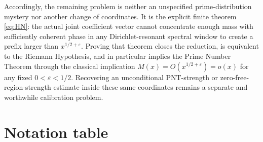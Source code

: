 \documentclass[11pt]{article}
\theoremstyle{definition}
\begin{document}
Accordingly, the remaining problem is neither an unspecified prime-distribution mystery nor another change of coordinates.  It is the explicit finite theorem \eqref{eq:HN}: the actual joint coefficient vector cannot concentrate enough mass with sufficiently coherent phase in any Dirichlet-resonant spectral window to create a prefix larger than $x^{1/2+\varepsilon}$.  Proving that theorem closes the reduction, is equivalent to the Riemann Hypothesis, and in particular implies the Prime Number Theorem through the classical implication $M(x)=O(x^{1/2+\varepsilon})=o(x)$ for any fixed $0<\varepsilon<1/2$.  Recovering an unconditional PNT-strength or zero-free-region-strength estimate inside these same coordinates remains a separate and worthwhile calibration problem.

\appendix

\section{Notation table}
\end{document}
